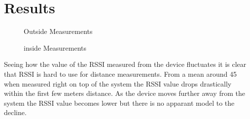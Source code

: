 \section{Results}
\label{sec_results}

\begin{figure}		



\caption{ Outside Measurements }
\label{graf_OutsideMesurements}

\end{figure}

\begin{figure}		
	
	
	
	\caption{ inside Measurements }
	\label{graf_InsideMesurements}
	
\end{figure}

Seeing how the value of the RSSI measured from the device fluctuates it is clear that RSSI is hard to use for distance measurements. From a mean around 45 when measured right on top of the system the RSSI value drops drastically within the first few meters distance. As the device moves further away from the system the RSSI value becomes lower but there is no apparant model to the decline.
